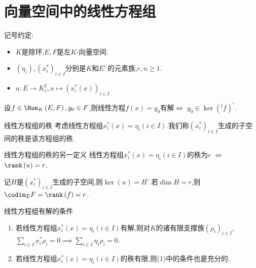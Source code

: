 \section{向量空间中的线性方程组}

记号约定:

\begin{itemize}
	\item $K$是除环,$E,F$是左$K$-向量空间.
	\item $\left(\eta_{i}\right),\left(x_{i}^{\ast}\right)_{i\in I}$分别是$K$和$E^{\vee}$的元素族,$r,n\geq 1$.
	\item $u:E\to K_{s}^{I},x\mapsto\left(x_{i}^{\ast}\left(x\right)\right)_{i\in I}$
\end{itemize}

\begin{proposition}{}{}
	设$f\in\Hom_{K}\left(E,F\right),y_{0}\in F$,则线性方程$f\left(x\right)=y_{0}$有解$\iff$ $y_{0}\in\ker\left(^{t}f\right)^{\circ}$.
\end{proposition}

\begin{definition}{线性方程组的秩}{}
	考虑线性方程组$x_{i}^{\ast}\left(x\right)=\eta_{i}\left(i\in I\right)$.我们称$\left(x_{i}^{\ast}\right)_{i\in I}$生成的子空间的秩是该方程组的秩.
\end{definition}

\begin{proposition}{线性方程组的秩的另一定义}{}
	线性方程组$x_{i}^{\ast}\left(x\right)=\eta_{i}\left(i\in I\right)$的秩为$r$ $\iff$ $\rank\left(u\right)=r$.
\end{proposition}

\begin{remark}{}{}
	记$H$是$\left(x_{i}^{\ast}\right)_{i\in I}$生成的子空间,则$\ker\left(u\right)=H^{\circ}$.若$\dim H=r$,则$\codim_{E}F=\rank\left(f\right)=r$.
\end{remark}

\begin{theorem}{线性方程组有解的条件}{}
	\begin{enumerate}
		\item 若线性方程组$x_{i}^{\ast}\left(x\right)=\eta_{i}\left(i\in I\right)$有解,则对$K$的诸有限支撑族$\left(\rho_{i}\right)_{i\in I}$,$\sum\limits_{i\in I}x_{i}^{\ast}\rho_{i}=0\implies\sum\limits_{i\in I}\eta_{i}\rho_{i}=0$.
		\item 若线性方程组$x_{i}^{\ast}\left(x\right)=\eta_{i}\left(i\in I\right)$的秩有限,则(1)中的条件也是充分的.
	\end{enumerate}
\end{theorem}{}

